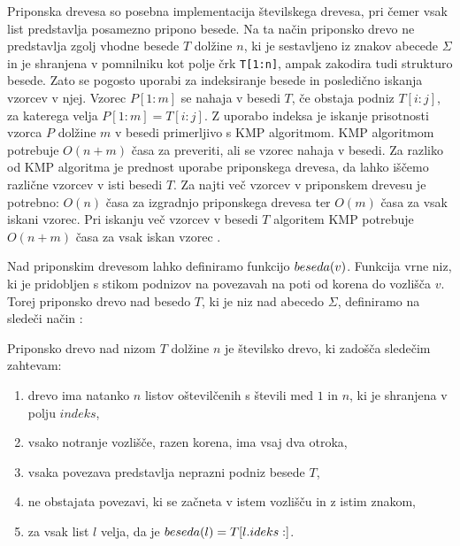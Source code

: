 Priponska drevesa so posebna implementacija številskega drevesa, pri čemer vsak list predstavlja posamezno pripono besede. Na ta način priponsko drevo ne predstavlja zgolj vhodne besede $T$ dolžine $n$, ki je sestavljeno iz znakov abecede $\Sigma$ in je shranjena v pomnilniku kot polje črk \texttt{T[1:n]}, ampak zakodira tudi strukturo besede. Zato se pogosto uporabi za indeksiranje besede in posledično iskanja vzorcev v njej. Vzorec $P[1:m]$ se nahaja v besedi $T$, če obstaja podniz $T[i:j]$, za katerega velja $P[1:m]=T[i:j]$. Z uporabo indeksa je iskanje prisotnosti vzorca $P$ dolžine $m$ v besedi primerljivo s KMP algoritmom. KMP algoritmom potrebuje $O(n+m)$ časa za preveriti, ali se vzorec nahaja v besedi. Za razliko od KMP algoritma je prednost uporabe priponskega drevesa, da lahko iščemo različne vzorcev v isti besedi $T$. Za najti več vzorcev v priponskem drevesu je potrebno: $O(n)$ časa za izgradnjo priponskega drevesa ter $O(m)$ časa za vsak iskani vzorec. Pri iskanju več vzorcev v besedi $T$ algoritem KMP potrebuje $O(n+m)$ časa za vsak iskan vzorec \cite{Gusfield1997,KMP}.


%
Nad priponskim drevesom lahko definiramo funkcijo $ \mathop{beseda}(v)$. Funkcija vrne niz, ki je pridobljen s stikom podnizov na povezavah na poti od korena do vozlišča $v$.
Torej priponsko drevo nad besedo $T$, ki je niz nad abecedo $\Sigma$, definiramo na sledeči način \cite{Gusfield1997}:

\begin{defi}\label{def:priposkoDrevo}
    Priponsko drevo nad nizom $T$ dolžine $n$ je številsko drevo, ki zadošča sledečim zahtevam:
    \begin{enumerate}
        \item drevo ima natanko $n$ listov oštevilčenih s števili med $1$ in $n$, ki je shranjena v polju $indeks$,
        \item vsako notranje vozlišče, razen korena, ima vsaj dva otroka,
        \item vsaka povezava predstavlja neprazni podniz besede $T$,
        \item ne obstajata %
        povezavi, ki se začneta v istem vozlišču in z istim znakom,
        \item za vsak list $l$ velja, da je $ \mathop{beseda}(l)=T[l.ideks:]$.        
    \end{enumerate}
\end{defi}




